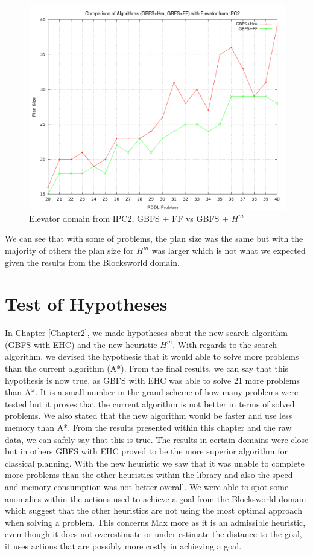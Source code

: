 \begin{figure}[!htb]
    \centering
    \includegraphics[scale=0.35]{Elevator20to40PlanSize.png}
    \caption{Elevator domain from IPC2, GBFS + FF vs GBFS + $H^m$ }
    \label{fig:ElevatorDomainGBFSwithHm}
\end{figure}
We can see that with some of problems, the plan size was the same but with the majority of others the plan size for $H^m$ was larger which is not what we expected given the results from the Blocksworld domain. 
\clearpage
\section{Test of Hypotheses}
In Chapter \ref{Chapter2}, we made hypotheses about the new search algorithm (GBFS with EHC) and the new heuristic $H^m$. With regards to the search algorithm, we devised the hypothesis that it would able to solve more problems than the current algorithm (A*). From the final results, we can say that this hypothesis is now true, as GBFS with EHC was able to solve 21 more problems than A*. It is a small number in the grand scheme of how many problems were tested but it proves that the current algorithm is not better in terms of solved problems. 
We also stated that the new algorithm would be faster and use less memory than A*. From the results presented within this chapter and the raw data, we can safely say that this is true. The results in certain domains were close but in others GBFS with EHC proved to be the more superior algorithm for classical planning.
With the new heuristic we saw that it was unable to complete more problems than the other heuristics within the library and also the speed and memory consumption was not better overall. We were able to spot some anomalies within the actions used to achieve a goal from the Blocksworld domain which suggest that the other heuristics are not using the most optimal approach when solving a problem. This concerns Max more as it is an admissible heuristic, even though it does not overestimate or under-estimate the distance to the goal, it uses actions that are possibly more costly in achieving a goal. 